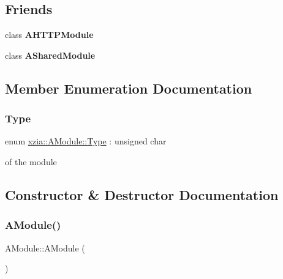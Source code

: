 \subsection*{Friends}
\begin{DoxyCompactItemize}
\item 
\mbox{\label{classxzia_1_1AModule_ad01ad146398700af5694cc756b1b1c63}} 
class {\bfseries A\+H\+T\+T\+P\+Module}
\item 
\mbox{\label{classxzia_1_1AModule_a4be1d2f00a5bbd45249ec22d62f1ff45}} 
class {\bfseries A\+Shared\+Module}
\end{DoxyCompactItemize}


\subsection{Member Enumeration Documentation}
\mbox{\label{classxzia_1_1AModule_a73967be2c863fcfdff0eef4a701df1e0}} 
\subsubsection{\texorpdfstring{Type}{Type}}
{\footnotesize\ttfamily enum \mbox{\hyperlink{classxzia_1_1AModule_a73967be2c863fcfdff0eef4a701df1e0}{xzia\+::\+A\+Module\+::\+Type}} \+: unsigned char\hspace{0.3cm}{\ttfamily [strong]}}

of the module 

\subsection{Constructor \& Destructor Documentation}
\mbox{\label{classxzia_1_1AModule_a1f9a69c543cb4d04be0a6d246ad0287d}} 
\subsubsection{\texorpdfstring{A\+Module()}{AModule()}}
{\footnotesize\ttfamily A\+Module\+::\+A\+Module (\begin{DoxyParamCaption}{ }\end{DoxyParamCaption})\hspace{0.3cm}{\ttfamily [delete]}}



